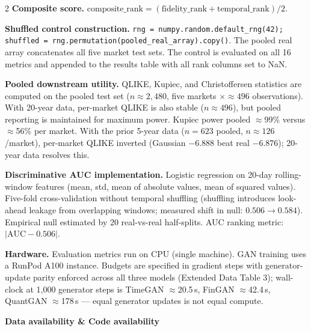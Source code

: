 \documentclass[10pt]{article}
\begin{document}
\begin{multicols}{2}
\textbf{Composite score.}
$\text{composite\_rank} = (\text{fidelity\_rank} + \text{temporal\_rank}) / 2$.

\textbf{Shuffled control construction.}
\texttt{rng = numpy.random.default\_rng(42); shuffled = rng.permutation(pooled\_real\_array).copy()}. The pooled real array concatenates all five market test sets. The control is evaluated on all 16 metrics and appended to the results table with all rank columns set to NaN.

\textbf{Pooled downstream utility.}
QLIKE, Kupiec, and Christoffersen statistics are computed on the pooled test set ($n\approx2{,}480$, five markets $\times\approx496$ observations). With 20-year data, per-market QLIKE is also stable ($n\approx496$), but pooled reporting is maintained for maximum power. Kupiec power pooled $\approx$99\% versus $\approx$56\% per market. With the prior 5-year data ($n=623$ pooled, $n\approx126$/market), per-market QLIKE inverted (Gaussian $-6.888$ beat real $-6.876$); 20-year data resolves this.

\textbf{Discriminative AUC implementation.}
Logistic regression on 20-day rolling-window features (mean, std, mean of absolute values, mean of squared values). Five-fold cross-validation without temporal shuffling (shuffling introduces look-ahead leakage from overlapping windows; measured shift in null: $0.506 \to 0.584$). Empirical null estimated by 20 real-vs-real half-splits. AUC ranking metric: $|\text{AUC} - 0.506|$.

\textbf{Hardware.} Evaluation metrics run on CPU (single machine). GAN training uses a RunPod A100 instance. Budgets are specified in gradient steps with generator-update parity enforced across all three models (Extended Data Table 3); wall-clock at 1,000 generator steps is TimeGAN $\approx$20.5\,s, FinGAN $\approx$42.4\,s, QuantGAN $\approx$178\,s --- equal generator updates is not equal compute.

\end{multicols}

\clearpage

\begin{tcolorbox}[
  colback=NavyBg, colframe=NavyBg!60!black, arc=4pt,
  left=8pt, right=8pt, top=4pt, bottom=4pt,
  before skip=0pt, after skip=10pt]
{\large\bfseries\color{Navy} Data availability \& Code availability}
\end{tcolorbox}
\end{document}
